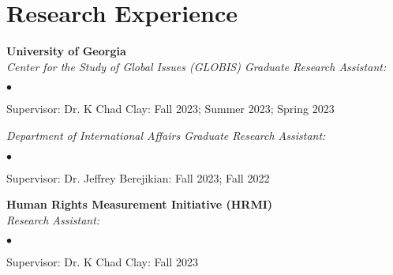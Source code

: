\documentclass[letterpaper,12pt]{article}
\newenvironment{list2}{
  \begin{list}{$\bullet$}{%
      \setlength{\itemsep}{0in}
      \setlength{\parsep}{0in} \setlength{\parskip}{0in}
      \setlength{\topsep}{0in} \setlength{\partopsep}{0in} 
      \setlength{\leftmargin}{0.5in}}}{\end{list}}
\begin{document}
\section{Research Experience}
\textbf{University of Georgia}\\
\textit{Center for the Study of Global Issues (GLOBIS) Graduate Research Assistant:}
\begin{list2}
    \item Supervisor: Dr. K Chad Clay: Fall 2023; Summer 2023; Spring 2023
\end{list2}
\par
\textit{Department of International Affairs Graduate Research Assistant:}
\begin{list2}
    \item Supervisor: Dr. Jeffrey Berejikian: Fall 2023; Fall 2022
\end{list2}
\par
\textbf{Human Rights Measurement Initiative (HRMI)}\\
\textit{Research Assistant:}
\begin{list2}
    \item Supervisor: Dr. K Chad Clay: Fall 2023
\end{list2}

\end{document}
